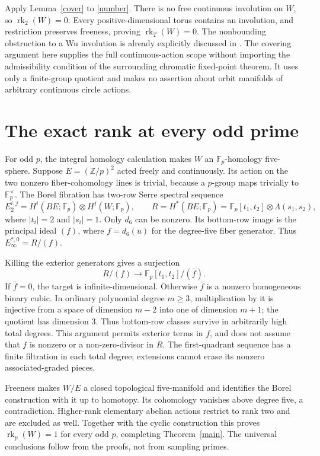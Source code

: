 \documentclass[10pt]{article}
\newcommand{\rk}{\operatorname{rk}}
\newcommand{\Fp}{\mathbb F_p}
\begin{document}
Apply Lemma~\ref{cover} to \eqref{number}. There is no free continuous
involution on \(W\), so \(\rk_2(W)=0\).
Every positive-dimensional torus contains an involution, and restriction
preserves freeness, proving \(\rk_T(W)=0\).
The nonbounding obstruction to a Wu involution is already explicitly
discussed in \cite[Theorem~9.1, v1; Example~2.25, v2]{KL}.
The covering argument here supplies the full continuous-action scope
without importing the admissibility condition of the surrounding
chromatic fixed-point theorem.
It uses only a finite-group quotient and makes no assertion about orbit
manifolds of arbitrary continuous circle actions.

\section{The exact rank at every odd prime}
For odd \(p\), the integral homology calculation makes \(W\) an
\(\Fp\)-homology five-sphere.
Suppose \(E=(\mathbb Z/p)^2\) acted freely and continuously.
Its action on the two nonzero fiber-cohomology lines is trivial, because
a \(p\)-group maps trivially to \(\Fp^\times\).
The Borel fibration has two-row Serre spectral sequence
\[
 E_2^{i,j}=H^i(BE;\Fp)\otimes H^j(W;\Fp),\qquad
 R=H^*(BE;\Fp)=\Fp[t_1,t_2]\otimes\Lambda(s_1,s_2),
\]
where \(|t_i|=2\) and \(|s_i|=1\).
Only \(d_6\) can be nonzero. Its bottom-row image is the principal ideal
\((f)\), where \(f=d_6(u)\) for the degree-five fiber generator.
Thus \(E_\infty^{*,0}=R/(f)\).

Killing the exterior generators gives a surjection
\[
 R/(f)\longrightarrow\Fp[t_1,t_2]/(\bar f).
\]
If \(\bar f=0\), the target is infinite-dimensional.
Otherwise \(\bar f\) is a nonzero homogeneous binary cubic.
In ordinary polynomial degree \(m\ge3\), multiplication by it is
injective from a space of dimension \(m-2\) into one of dimension \(m+1\);
the quotient has dimension \(3\).
Thus bottom-row classes survive in arbitrarily high total degrees.
This argument permits exterior terms in \(f\), and does not assume that
\(f\) is nonzero or a non-zero-divisor in \(R\).
The first-quadrant sequence has a finite filtration in each total degree;
extensions cannot erase its nonzero associated-graded pieces.

Freeness makes \(W/E\) a closed topological five-manifold and identifies
the Borel construction with it up to homotopy.
Its cohomology vanishes above degree five, a contradiction.
Higher-rank elementary abelian actions restrict to rank two and are
excluded as well. Together with the cyclic construction this proves
\(\rk_p(W)=1\) for every odd \(p\), completing Theorem~\ref{main}.
The universal conclusions follow from the proofs, not from sampling primes.
\end{document}
